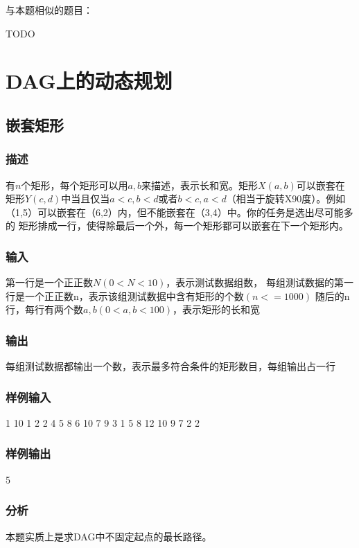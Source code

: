 与本题相似的题目：
\begindot
\item  TODO
\myenddot

\section{DAG上的动态规划} %

\subsection{嵌套矩形}

\subsubsection{描述}
有$n$个矩形，每个矩形可以用$a,b$来描述，表示长和宽。矩形$X(a,b)$可以嵌套在
矩形$Y(c,d)$中当且仅当$a<c,b<d$或者$b<c,a<d$（相当于旋转X90度）。例如
（1,5）可以嵌套在（6,2）内，但不能嵌套在（3,4）中。你的任务是选出尽可能多的
矩形排成一行，使得除最后一个外，每一个矩形都可以嵌套在下一个矩形内。

\subsubsection{输入}
第一行是一个正正数$N(0<N<10)$，表示测试数据组数，
每组测试数据的第一行是一个正正数n，表示该组测试数据中含有矩形的个数$(n<=1000)$
随后的n行，每行有两个数$a,b(0<a,b<100)$，表示矩形的长和宽

\subsubsection{输出}
每组测试数据都输出一个数，表示最多符合条件的矩形数目，每组输出占一行

\subsubsection{样例输入}
\begin{Code}
1
10
1 2
2 4
5 8
6 10
7 9
3 1
5 8
12 10
9 7
2 2
\end{Code}

\subsubsection{样例输出}
\begin{Code}
5
\end{Code}

\subsubsection{分析}
本题实质上是求DAG中不固定起点的最长路径。

